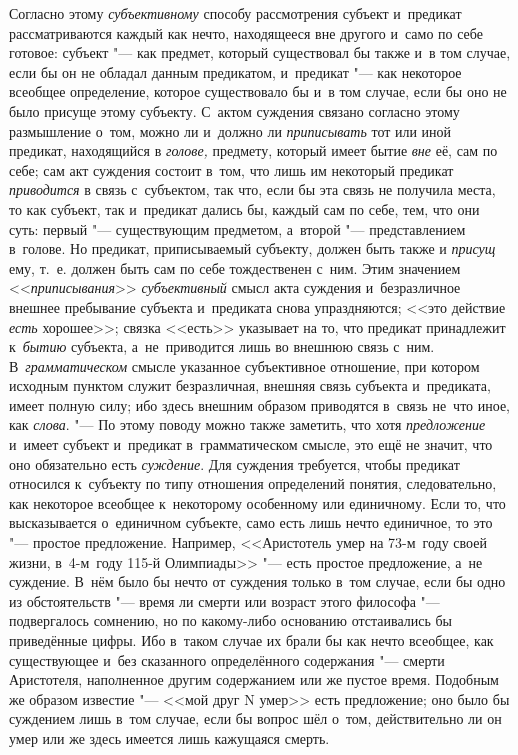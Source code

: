 Согласно этому {\em субъективному}
способу рассмотрения субъект и~предикат рассматриваются
каждый как нечто, находящееся вне другого и~само по себе готовое: субъект
"--- как предмет, который существовал бы также и~в том случае,
если бы он не обладал данным предикатом, и~предикат "--- как
некоторое всеобщее определение, которое существовало бы и~в том случае,
если бы оно не было присуще этому субъекту. С~актом суждения связано
согласно этому размышление о~том, можно ли и~должно ли
{\em приписывать} тот или иной предикат, находящийся в
{\em голове,} предмету, который имеет бытие {\em вне}
её, сам по себе; сам акт суждения состоит в~том, что лишь им
некоторый предикат {\em приводится}
в связь с~субъектом, так что, если бы эта связь не получила
места, то как субъект, так и~предикат дались бы, каждый сам по себе, тем,
что они суть: первый "--- существующим предметом, а~второй
"--- представлением в~голове. Но предикат, приписываемый
субъекту, должен быть также и {\em присущ} ему, т.~е.
должен быть сам по себе тождественен с~ним. Этим значением
<<{\em приписывания}>> {\em субъективный} смысл
акта суждения и~безразличное внешнее пребывание субъекта и~предиката снова
упраздняются; <<это действие {\em есть} хорошее>>; связка <<есть>> указывает
на то, что предикат принадлежит к~{\em бытию} субъекта, а~не~приводится лишь
во внешнюю связь с~ним. В~{\em грамматическом} смысле указанное субъективное
отношение, при котором исходным пунктом служит безразличная, внешняя связь
субъекта и~предиката, имеет полную силу; ибо здесь внешним образом приводятся
в~связь не~что иное, как {\em слова}. "--- По этому поводу можно также
заметить, что хотя {\em предложение} и~имеет субъект и~предикат
в~грамматическом смысле, это ещё не значит, что оно обязательно есть
{\em суждение}. Для суждения требуется, чтобы предикат относился к~субъекту
по типу отношения определений понятия, следовательно, как некоторое
всеобщее к~некоторому особенному или единичному. Если то,
что высказывается о~единичном субъекте, само есть лишь нечто единичное, то
это "--- простое предложение. Например, <<Аристотель умер на 73-м~году своей
жизни, в~4-м~году 115-й
Олимпиады>> "--- есть простое предложение, а~не суждение. В~нём было бы нечто
от суждения только в~том случае, если бы одно из обстоятельств "--- время ли
смерти или возраст этого философа "--- подвергалось сомнению, но по какому-либо
основанию отстаивались бы приведённые цифры. Ибо в~таком случае их брали бы как
нечто всеобщее, как существующее и~без сказанного определённого содержания "---
смерти Аристотеля, наполненное другим содержанием или же пустое время. Подобным
же образом известие "--- <<мой друг N умер>> есть предложение; оно было бы
суждением лишь в~том случае, если бы вопрос шёл о~том, действительно ли он умер
или же здесь имеется лишь кажущаяся смерть.

